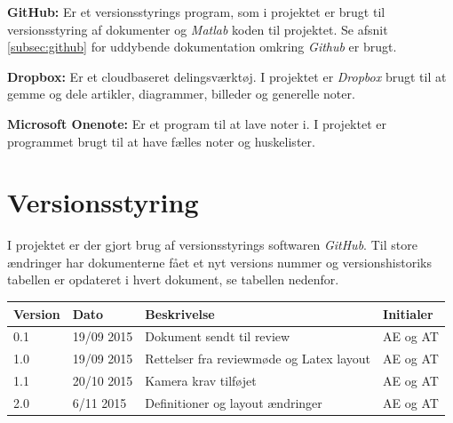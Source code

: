 \textbf{GitHub:} Er et versionsstyrings program, som i projektet er brugt til versionsstyring af dokumenter og \textit{Matlab} koden til projektet. Se afsnit \ref{subsec:github} for uddybende dokumentation omkring \textit{Github} er brugt.

\textbf{Dropbox:} Er et cloudbaseret delingsværktøj. I projektet er \textit{Dropbox} brugt til at gemme og dele artikler, diagrammer, billeder og generelle noter.

\textbf{Microsoft Onenote:} Er et program til at lave noter i. I projektet er programmet brugt til at have fælles noter og huskelister.


\newpage
\section{Versionsstyring}
I projektet er der gjort brug af versionsstyrings softwaren \textit{GitHub}. Til store ændringer har dokumenterne fået et nyt versions nummer og versionshistoriks tabellen er opdateret i hvert dokument, se tabellen nedenfor. 

\begin{center}
		\begin{longtable}{ | m{1.5cm} | m{2cm}| m{7cm}| m{2cm}| } 
			\hline
			\textbf{Version}  & \textbf{Dato} & \textbf{Beskrivelse} & \textbf{Initialer}  \\ 
			\hline
			0.1  &  19/09 2015  & Dokument sendt til review & AE og AT \\
			\hline
		1.0  &  19/09 2015  & Rettelser fra reviewmøde og Latex layout & AE og AT \\
		\hline
		1.1  &  20/10 2015  & Kamera krav tilføjet & AE og AT \\
		\hline
		2.0  &  6/11 2015  & Definitioner og layout ændringer & AE og AT \\
			\hline
		\end{longtable}
		
	\end{center}


